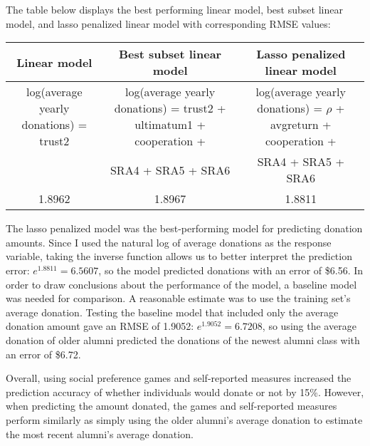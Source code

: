 \documentclass[12pt]{article}
\begin{document}
 
The table below displays the best performing linear model, best subset linear model, and lasso penalized linear model with corresponding RMSE values:
 
\vspace{5mm} \begin{adjustbox}{width=\textwidth}
\begin{tabular}{ c | c | c }
\hline \hline
Linear model & Best subset linear model & Lasso penalized linear model \\
\hline
log(average yearly donations) = trust2 & log(average yearly donations) = trust2 + ultimatum1 + cooperation + & log(average yearly donations) = \(\rho\) + avgreturn + cooperation + \\
\small &  SRA4 + SRA5 + SRA6 & SRA4 + SRA5 + SRA6 \\
\hline
1.8962 & 1.8967 & 1.8811 \\
\hline \hline
\end{tabular}
\end{adjustbox}


\vspace{5mm} The lasso penalized model was the best-performing model for predicting donation amounts. Since I used the natural log of average donations as the response variable, taking the inverse function allows us to better interpret the prediction error: \(e^{1.8811} = 6.5607\), so the model predicted donations with an error of \$6.56. In order to draw conclusions about the performance of the model, a baseline model was needed for comparison. A reasonable estimate was to use the training set\rq s average donation. Testing the baseline model that included only the average donation amount gave an RMSE of 1.9052: \(e^{1.9052} = 6.7208\), so using the average donation of older alumni predicted the donations of the newest alumni class with an error of \$6.72. 


Overall, using social preference games and self-reported measures increased the prediction accuracy of whether individuals would donate or not by 15\%. However, when predicting the amount donated, the games and self-reported measures perform similarly as simply using the older alumni\rq s average donation to estimate the most recent alumni\rq s average donation.
\end{document}
